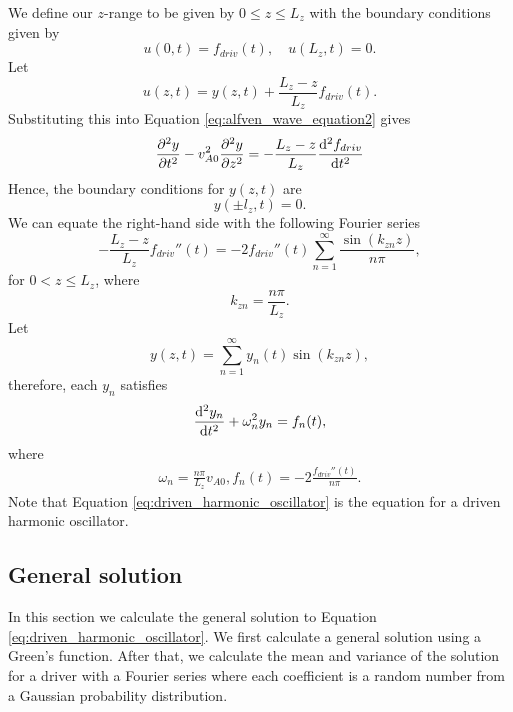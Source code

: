 We define our $z$-range to be given by $0\le z\le L_z$ with the boundary conditions given by
\begin{equation}
    u(0,t) = f_{driv}(t),\quad u(L_z,t) = 0.
\end{equation}
Let
\begin{equation}
    u(z,t) = y(z,t) + \frac{L_z - z}{L_z}f_{driv}(t).
\end{equation}
Substituting this into Equation \eqref{eq:alfven_wave_equation2} gives
\begin{equation}
    \begin{aligned}
    \pdv[2]{y}{t}-v_{A0}^2\pdv[2]{y}{z}&=-\frac{L_z - z}{L_z}\dv[2]{f_{driv}}{t} \\
    \end{aligned}
\end{equation}
Hence, the boundary conditions for $y(z,t)$ are
\begin{equation}
    y(\pm l_z, t) = 0.
\end{equation}
We can equate the right-hand side with the following Fourier series
\begin{equation}
    -\frac{L_z - z}{L_z}f_{driv}''(t) = -2f_{driv}''(t)\sum_{n=1}^\infty \frac{\sin(k_{zn} z)}{n\pi},
\end{equation}
for $0<z\le L_z$, where
\begin{equation}
    k_{zn} = \frac{n\pi}{L_z}.
\end{equation}
Let
\begin{equation}
    y(z,t) = \sum_{n=1}^\infty y_n(t)\sin(k_{zn}z),
\end{equation}
therefore, each $y_n$ satisfies
\begin{equation}
    \label{eq:driven_harmonic_oscillator}
    \dv[2]{y_n}{t} + \omega_n^2y_n=f_n(t),
\end{equation}
where 
\begin{gather}
    \omega_n = \frac{n\pi}{L_z}v_{A0},
    f_n(t) = -2\frac{f_{driv}''(t)}{n\pi}.
\end{gather}
Note that Equation \eqref{eq:driven_harmonic_oscillator} is the equation for a driven harmonic oscillator.

\subsection{General solution}

In this section we calculate the general solution to Equation \eqref{eq:driven_harmonic_oscillator}. We first calculate a general solution using a Green's function. After that, we calculate the mean and variance of the solution for a driver with a Fourier series where each coefficient is a random number from a Gaussian probability distribution.

